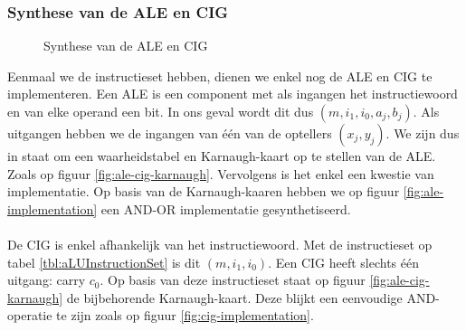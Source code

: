 \subsubsection{Synthese van de ALE en CIG}
\begin{figure}[hbt]
\centering
{}
\caption{Synthese van de ALE en CIG}
\end{figure}
Eenmaal we de instructieset hebben, dienen we enkel nog de ALE en CIG te implementeren. Een ALE is een component met als ingangen het instructiewoord en van elke operand een bit. In ons geval wordt dit dus $\left(m,i_1,i_0,a_j,b_j\right)$. Als uitgangen hebben we de ingangen van \'e\'en van de optellers $\left(x_j,y_j\right)$. We zijn dus in staat om een waarheidstabel en Karnaugh-kaart op te stellen van de ALE. Zoals op figuur \ref{fig:ale-cig-karnaugh}. Vervolgens is het enkel een kwestie van implementatie. Op basis van de Karnaugh-kaaren hebben we op figuur \ref{fig:ale-implementation} een AND-OR implementatie gesynthetiseerd.
\paragraph{}
De CIG is enkel afhankelijk van het instructiewoord. Met de instructieset op tabel \ref{tbl:aLUInstructionSet} is dit $\left(m,i_1,i_0\right)$. Een CIG heeft slechts \'e\'en uitgang: carry $c_0$. Op basis van deze instructieset staat op figuur \ref{fig:ale-cig-karnaugh} de bijbehorende Karnaugh-kaart. Deze blijkt een eenvoudige AND-operatie te zijn zoals op figuur \ref{fig:cig-implementation}.
